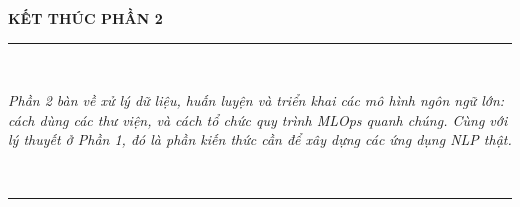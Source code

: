 \clearpage
\thispagestyle{empty}

\begin{center}
	\vspace*{4cm}
	{\Huge \textbf{KẾT THÚC PHẦN 2}} \\[1.5cm]
	
	\rule{0.8\textwidth}{0.4pt} \\[0.8cm]
	
	\parbox{0.9\textwidth}{
		\centering
		\textit{
			Phần 2 bàn về xử lý dữ liệu, huấn luyện và triển khai các mô hình ngôn ngữ
			lớn: cách dùng các thư viện, và cách tổ chức quy trình MLOps quanh chúng.
			Cùng với lý thuyết ở Phần 1, đó là phần kiến thức cần để xây dựng các ứng
			dụng NLP thật.
		}
	} \\[1cm]
	
	\rule{0.8\textwidth}{0.4pt} \\[2cm]
\end{center}